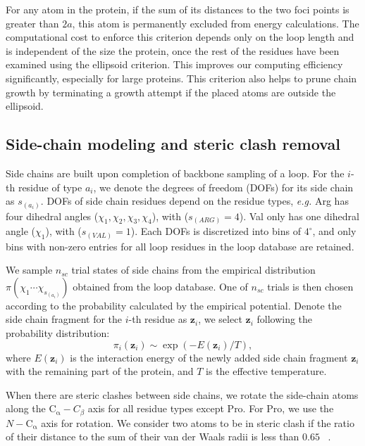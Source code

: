 For any atom in the protein, if the sum of its distances to the two
foci points is greater than $2a$, this atom is permanently excluded
from energy calculations. The computational cost to enforce this
criterion depends only on the loop length and is independent of the
size the protein, once the rest of the residues have been examined
using the ellipsoid criterion. This improves our computing
efficiency significantly, especially for large proteins. This
criterion also helps to prune chain growth by terminating a growth
attempt if the placed atoms are outside the ellipsoid.


\subsection*{Side-chain modeling and steric clash removal}
\label{sidechain}

Side chains are built upon completion of backbone sampling of a
loop. For the $i$-th residue of type $a_i$, we denote the degrees of
freedom (DOFs) for its side chain as $s_{(a_i)}$. DOFs of side chain
residues depend on the residue types, {\it e.g.} Arg has four
dihedral angles ($\chi_{1}, \chi_{2}, \chi_{3}, \chi_{4}$), with
($s_{(ARG)} = 4$). Val only has one dihedral angle ($\chi_{1}$),
with ($s_{(VAL)} = 1$). Each DOFs is discretized into bins of
$4^{\circ}$, and only bins with non-zero entries for all loop
residues in the loop database are retained.

We sample $n_{sc}$ trial states of side chains from the empirical
distribution $\pi(\chi_{1} \cdots \chi_{s_{(a_i)}})$ obtained from
the loop database. One of $n_{sc}$ trials is then chosen according
to the probability calculated by the empirical potential. Denote the
side chain fragment for the $i$-th residue as $\mathbf{z}_i$, we
select $\mathbf{z}_{i}$ following the probability distribution:
$$
\pi_{i}(\mathbf{z}_{i}) \sim \exp({-E(\mathbf{z}_{i})}/T ),
$$ where $E (\mathbf{z}_{i}) $ is the interaction energy of the newly added
side chain fragment $\mathbf{z}_{i}$ with the remaining part of the
protein, and $T$ is the effective temperature.

When there are steric clashes between side chains, we rotate the
side-chain atoms along the $\mathrm{C_{\alpha}}-C_{\beta}$ axis for
all residue types except Pro. For Pro, we use the
$N-\mathrm{C_{\alpha}}$ axis for rotation. We consider two atoms to
be in steric clash if the ratio of their distance to the sum of
their van der Waals radii is less than $0.65$ ~\cite{jacobson2004}.


